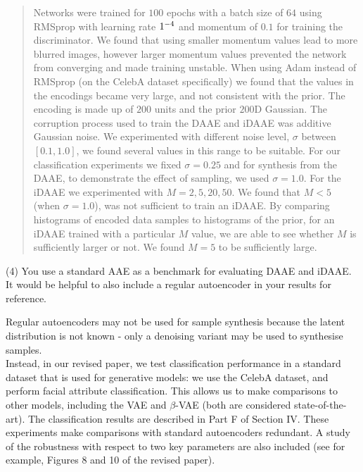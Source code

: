 \documentclass[a4paper,11pt]{article}
\begin{document}
\begin{quote}
{\color{red} Networks were trained for $100$ epochs with a batch size of $64$ using RMSprop with learning rate $1 \time 10^{-4}$ and momentum of $0.1$ for training the discriminator. We found that using smaller momentum values lead to more blurred images, however larger momentum values prevented the network from converging and made training unstable. When using Adam instead of RMSprop (on the CelebA dataset specifically) we found that the values in the encodings became very large, and not consistent with the prior. The encoding is made up of $200$ units and the prior $200$D Gaussian. The corruption process used to train the DAAE and iDAAE was additive Gaussian noise. We experimented with different noise level, $\sigma$ between $[0.1, 1.0]$, we found several values in this range to be suitable. For our classification experiments we fixed $\sigma=0.25$ and for synthesis from the DAAE, to demonstrate the effect of sampling, we used $\sigma=1.0$. For the iDAAE we experimented with $M=2, 5, 20, 50$. We found that $M < 5$ (when $\sigma=1.0$), was not sufficient to train an iDAAE. By comparing histograms of encoded data samples to histograms of the prior, for an iDAAE trained with a particular $M$ value, we are able to see whether $M$ is sufficiently larger or not. We found $M=5$ to be sufficiently large.}
\end{quote}


{\color{blue}
(4) You use a standard AAE as a benchmark for evaluating DAAE and iDAAE. It would be helpful to also include a regular autoencoder in your results for reference.}\newline

Regular autoencoders may not be used for sample synthesis because the latent distribution is not known - only a denoising variant may be used to synthesise samples. \\

Instead, in our revised paper, we test classification performance in a standard dataset that is used for generative models: we use the CelebA dataset, and perform facial attribute classification. This allows us to make comparisons to other models, including the VAE and $\beta$-VAE (both are considered state-of-the-art).  The classification results are described in Part F of Section IV. These experiments make comparisons with standard autoencoders redundant. A study of the robustness with respect to two key parameters are also included (see for example, Figures 8 and 10 of the revised paper). \newline
\end{document}
